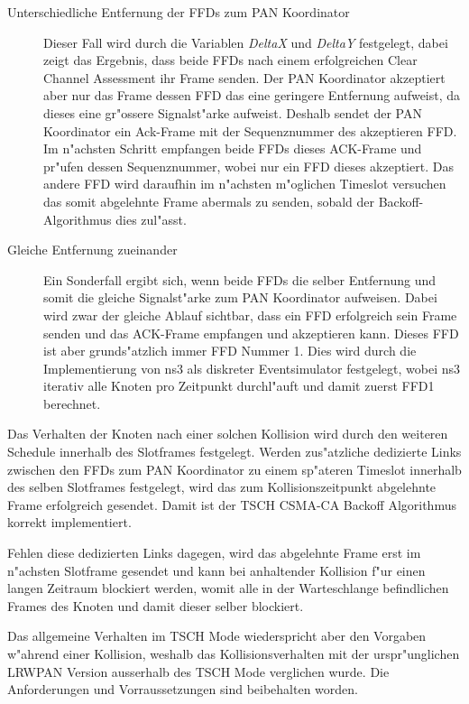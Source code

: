\begin{description}
  \item[Unterschiedliche Entfernung der FFDs zum PAN Koordinator]
  Dieser Fall wird durch die Variablen \textit{DeltaX} und \textit{DeltaY} festgelegt,
  dabei zeigt das Ergebnis, dass beide FFDs nach einem erfolgreichen Clear Channel
  Assessment ihr Frame senden. Der PAN Koordinator akzeptiert aber nur das Frame
  dessen FFD das eine geringere Entfernung aufweist, da dieses eine gr"ossere
  Signalst"arke aufweist. Deshalb sendet der PAN Koordinator ein Ack-Frame mit der
  Sequenznummer des akzeptieren FFD. Im n"achsten Schritt empfangen beide FFDs dieses
  ACK-Frame und pr"ufen dessen Sequenznummer, wobei nur ein FFD dieses akzeptiert.
  Das andere FFD wird daraufhin im n"achsten m"oglichen Timeslot versuchen das
  somit abgelehnte Frame abermals zu senden, sobald der Backoff-Algorithmus dies zul"asst.
  \item[Gleiche Entfernung zueinander]
  Ein Sonderfall ergibt sich, wenn beide FFDs die selber Entfernung und somit die
  gleiche Signalst"arke zum PAN Koordinator aufweisen.
  Dabei wird zwar der gleiche Ablauf sichtbar, dass ein FFD erfolgreich
  sein Frame senden und das ACK-Frame empfangen und akzeptieren kann. Dieses FFD
  ist aber grunds"atzlich immer FFD Nummer 1. Dies wird durch die Implementierung
  von ns3 als diskreter Eventsimulator festgelegt, wobei ns3 iterativ alle Knoten pro
  Zeitpunkt durchl"auft und damit zuerst FFD1 berechnet.
\end{description}

Das Verhalten der Knoten nach einer solchen Kollision wird durch den weiteren
Schedule innerhalb des Slotframes festgelegt. Werden zus"atzliche dedizierte
Links zwischen den FFDs zum PAN Koordinator zu einem sp"ateren Timeslot innerhalb
des selben Slotframes festgelegt, wird das zum Kollisionszeitpunkt abgelehnte Frame
erfolgreich gesendet. Damit ist der TSCH CSMA-CA Backoff Algorithmus korrekt implementiert.

Fehlen diese dedizierten Links dagegen, wird das abgelehnte Frame erst im n"achsten Slotframe
gesendet und kann bei anhaltender Kollision f"ur einen langen Zeitraum blockiert werden,
womit alle in der Warteschlange befindlichen Frames des Knoten und damit dieser selber
blockiert.

Das allgemeine Verhalten im TSCH Mode wiederspricht aber den Vorgaben w"ahrend einer
Kollision, weshalb das Kollisionsverhalten mit der urspr"unglichen LRWPAN Version
ausserhalb des TSCH Mode verglichen wurde. Die Anforderungen und Vorraussetzungen sind
beibehalten worden.

